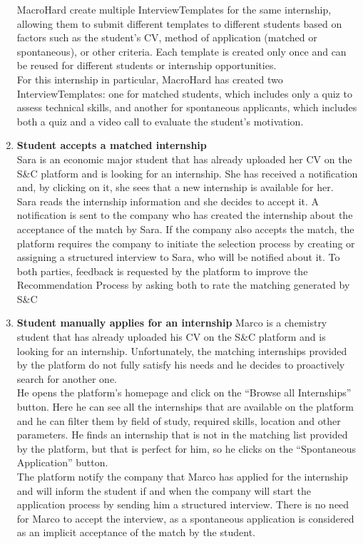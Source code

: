 \begin{enumerate}
        MacroHard create multiple InterviewTemplates for the same internship, allowing them to submit different templates to different students based on factors such as the student’s CV, method of application (matched or spontaneous), or other criteria. Each template is created only once and can be reused for different students or internship opportunities.\\
        For this internship in particular, MacroHard has created two InterviewTemplates: one for matched students, which includes only a quiz to assess technical skills, and another for spontaneous applicants, which includes both a quiz and a video call to evaluate the student’s motivation.
    \item \textbf{\textcolor{titleColor}{Student accepts a matched internship}}\\
        Sara is an economic major student that has already uploaded her CV on the S\&C platform and is looking for an internship. She has received a notification and, by clicking on it, she sees that a new internship is available for her.\\
        Sara reads the internship information and she decides to accept it. A notification is sent to the company who has created the internship about the acceptance of the match by Sara. If the company also accepts the match, the platform requires the company to initiate the selection process by creating or assigning a structured interview to Sara, who will be notified about it.
        To both parties, feedback is requested by the platform to improve the Recommendation Process by asking both to rate the matching generated by S\&C  
    \item \textbf{\textcolor{titleColor}{Student manually applies for an internship}}  
        Marco is a chemistry student that has already uploaded his CV on the S\&C platform and is looking for an internship. Unfortunately, the matching internships provided by the platform do not fully satisfy his needs and he decides to proactively search for another one.\\
        He opens the platform's homepage and click on the “Browse all Internships” button. Here he can see all the internships that are available on the platform and he can filter them by field of study, required skills, location and other parameters.
        He finds an internship that is not in the matching list provided by the platform, but that is perfect for him, so he clicks on the “Spontaneous Application” button.\\
        The platform notify the company that Marco has applied for the internship and will inform the student if and when the company will start the application process by sending him a structured interview. There is no need for Marco to accept the interview, as a spontaneous application is considered as an implicit acceptance of the match by the student.

\end{enumerate}
